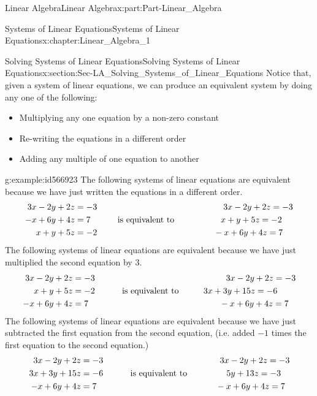\documentclass[oneside,10pt,]{book}
\numberwithin{equation}{section}
\newcommand{\amp}{&}
\begin{document}
\begin{partptx}{Linear Algebra}{}{Linear Algebra}{}{}{x:part:Part-Linear_Algebra}
\begin{chapterptx}{Systems of Linear Equations}{}{Systems of Linear Equations}{}{}{x:chapter:Linear_Algebra_1}
\begin{sectionptx}{Solving Systems of Linear Equations}{}{Solving Systems of Linear Equations}{}{}{x:section:Sec-LA_Solving_Systems_of_Linear_Equations}
Notice that, given a system of linear equations, we can produce an equivalent system by doing any one of the following:%
\par
%
\begin{itemize}[label=\textbullet]
\item{}Multiplying any one equation by a non-zero constant%
\item{}Re-writing the equations in a different order%
\item{}Adding any multiple of one equation to another%
\end{itemize}
%
\begin{example}{}{g:example:id566923}%
The following systems of linear equations are equivalent because we have just written the equations in a different order.%
\begin{align*}
3x-2y+2z \amp =-3 \hspace{52mm} 3x-2y+2z =-3\\
-x+6y+4z \amp =7 \hspace{10mm} \textrm{ is equivalent to } \hspace{18mm} x+y+5z =-2\\
x+y+5z \amp =-2 \hspace{48mm} -x+6y+4z =7
\end{align*}
The following systems of linear equations are equivalent because we have just multiplied the second equation by \(3\).%
\begin{align*}
3x-2y+2z \amp =-3 \hspace{54mm} 3x-2y+2z =-3\\
x+y+5z \amp =-2 \hspace{10mm} \textrm{ is equivalent to } \hspace{9mm} 3x+3y+15z =-6\\
-x+6y+4z \amp =7 \hspace{54mm} -x+6y+4z =7
\end{align*}
The following systems of linear equations are equivalent because we have just subtracted the first equation from the second equation, (i.e. added \(-1\) times the first equation to the second equation.)%
\begin{align*}
3x-2y+2z \amp =-3 \hspace{48mm} 3x-2y+2z =-3\\
3x+3y+15z \amp =-6 \hspace{10mm} \textrm{ is equivalent to } \hspace{15mm} 5y+13z =-3\\
-x+6y+4z \amp =7 \hspace{49mm} -x+6y+4z =7

\end{align*}
\end{example}
\end{sectionptx}
\end{chapterptx}
\end{partptx}
\end{document}
